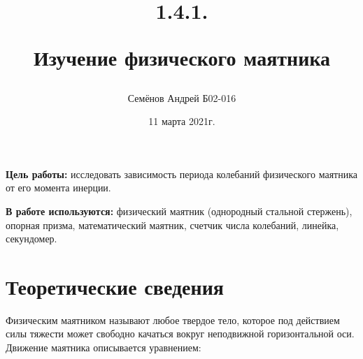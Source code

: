 \documentclass[13pt,a4paper]{article}
\title{
1.4.1.

Изучение физического маятника
}
\author{Семёнов Андрей Б02-016}
\date{11 марта 2021г.}
\begin{document}
\maketitle
\newpage

\textbf{Цель работы:} исследовать зависимость периода колебаний физического маятника от его момента инерции.


\textbf{В работе используются:} физический маятник (однородный стальной стержень), опорная призма, математический маятник, счетчик числа колебаний, линейка, секундомер.

\section{Теоретические сведения}
Физическим маятником называют любое твердое тело, которое под действием силы тяжести может свободно качаться вокруг неподвижной горизонтальной оси. Движение маятника описывается уравнением:
\end{document}
